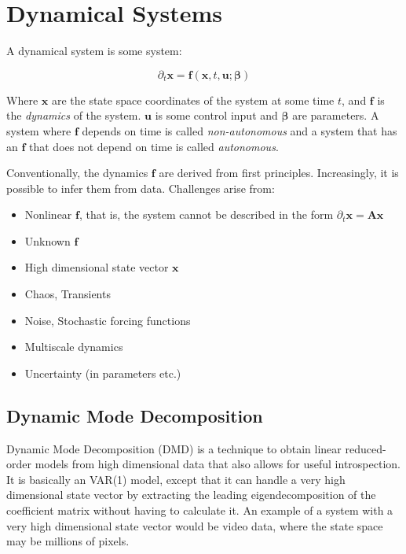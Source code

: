 \chapter{Dynamical Systems}
\label{chp:dynamicalsystems}

A dynamical system is some system:

\begin{equation}
\partial_t\mathbf{x} = \mathbf{f}(\mathbf{x},t,\mathbf{u};\mathbf{\beta})
\end{equation}

Where $\mathbf{x}$ are the state space coordinates of the system at some time $t$, and $\mathbf{f}$ is the \textit{dynamics} of the system. $\mathbf{u}$ is some control input and $\mathbf{\beta}$ are parameters. A system where $\mathbf{f}$ depends on time is called \textit{non-autonomous} and a system that has an $\mathbf{f}$ that does not depend on time is called \textit{autonomous}.  

Conventionally, the dynamics $\mathbf{f}$ are derived from first principles. Increasingly, it is possible to infer them from data. Challenges arise from:

\begin{itemize}
\item Nonlinear $\mathbf{f}$, that is, the system cannot be described in the form $\partial_t\mathbf{x}=\mathbf{Ax}$
\item Unknown $\mathbf{f}$
\item High dimensional state vector $\mathbf{x}$
\item Chaos, Transients
\item Noise, Stochastic forcing functions
\item Multiscale dynamics
\item Uncertainty (in parameters etc.)
\end{itemize}


\section{Dynamic Mode Decomposition}
Dynamic Mode Decomposition (DMD) is a technique to obtain linear reduced-order models from high dimensional data that also allows for useful introspection. It is basically an VAR(1) model, except that it can handle a very high dimensional state vector by extracting the leading eigendecomposition of the coefficient matrix without having to calculate it. An example of a system with a very high dimensional state vector would be video data, where the state space may be millions of pixels. 

